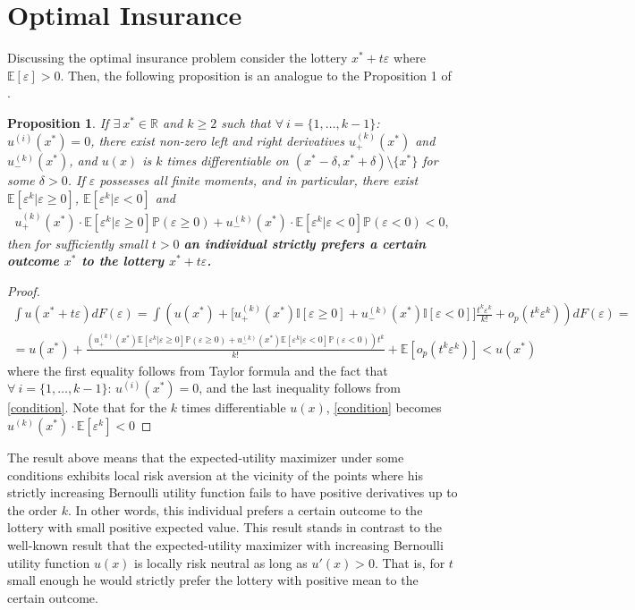 \documentclass[a4paper]{article}
\newcommand{\prob}{\mathbb{P}}
\newcommand{\expect}{\mathbb{E}}
\newcommand{\eps}{\varepsilon}
\newtheorem{proposition}[theorem]{Proposition}
\begin{document}
\section{Optimal Insurance}
Discussing the optimal insurance problem consider the lottery $x^*+t \eps $ where $\expect[\eps] > 0$. Then, the following proposition is an analogue to the Proposition 1 of \cite{segal1990first}.
\begin{proposition}\label{LRA}
	If $\exists\ x^* \in \mathbb{R}$ and $k \ge 2$ such that $\forall\ i = \{1, \dots, k-1  \}$: $u^{(i)}(x^*) = 0$, there exist non-zero left and right derivatives $u^{(k)}_{+}(x^*)$ and $u^{(k)}_{-}(x^*)$, and $u(x)$ is $k$ times differentiable on $(x^*-\delta, x^*+\delta)\setminus\{x^*\}$ for some $\delta>0$. If $\eps$ possesses all finite moments, and in particular, there exist $\expect[ \eps^k |\eps\ge0]$, $\expect[ \eps^k |\eps<0]$ and \begin{align}\label{condition}
		u^{(k)}_{+}(x^*) \cdot \expect[ \eps^k | \eps\ge0]\prob(\eps\ge0) + u^{(k)}_{-}(x^*) \cdot \expect[ \eps^k | \eps<0]\prob(\eps<0) < 0,
		\end{align}
	then for sufficiently small $t > 0$ \textbf{an individual strictly prefers a certain outcome $x^*$ to the lottery $x^*+t\eps$.}
\end{proposition}
\begin{proof}
	\begin{align*}
		\int u(x^*+t\eps)dF(\eps) = \int \left( u(x^*) +  \bigg[u^{(k)}_{+}(x^*)\mathbb{I}[\eps\ge0]  + u^{(k)}_{-}(x^*)\mathbb{I}[\eps<0] \bigg] \frac{t^k \eps^k }{k!} +o_p(t^k \eps^k)\right)dF(\eps) = \\
	= u(x^*) + \frac{(u^{(k)}_{+}(x^*) \expect[\eps^k|\eps\ge 0]\prob(\eps\ge0)+u^{(k)}_{-}(x^*) \expect[\eps^k|\eps< 0]\prob(\eps<0))t^k}{k!} + \expect[o_p(t^k \eps^k)] < u(x^*)
	\end{align*}
where the first equality follows from Taylor formula and the fact that $\forall\ i = \{1, \dots, k-1  \}$: $u^{(i)}(x^*) = 0$, and the last inequality follows from \eqref{condition}. Note that for the $k$ times differentiable $u(x)$, \eqref{condition} becomes $u^{(k)}(x^*)\cdot\expect[\eps^k] < 0$
\end{proof}
The result above means that the expected-utility maximizer under some conditions exhibits local risk aversion at the vicinity of the points where his strictly increasing Bernoulli utility function fails to have positive derivatives up to the order $k$. In other words, this individual prefers a certain outcome to the lottery with small positive expected value. This result stands in contrast to the well-known result that the expected-utility maximizer with increasing Bernoulli utility function $u(x)$ is locally risk neutral as long as $u'(x) > 0$. That is, for $t$ small enough he would strictly prefer the lottery with positive mean to the certain outcome.
\end{document}
